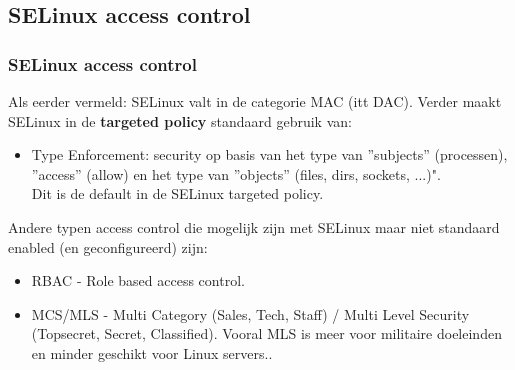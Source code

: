 \subsection{SELinux access control}
\begin{styleframe}
    \frametitle{SELinux access control}
\pause
Als eerder vermeld: SELinux valt in de categorie MAC (itt DAC). Verder maakt SELinux in de {\bf targeted policy} standaard gebruik van:
\begin{itemize}
	\item Type Enforcement: security op basis van het type van ''subjects'' (processen), ''access'' (allow) en het type van ''objects'' (files, dirs, sockets, ...)".\\
Dit is de default in de SELinux targeted policy.
\end{itemize}
\pause
Andere typen access control die mogelijk zijn met SELinux maar niet standaard enabled (en geconfigureerd) zijn:
\begin{itemize}
	\item RBAC - Role based access control.
	\pause
	\item MCS/MLS - Multi Category (Sales, Tech, Staff) / Multi Level Security (Topsecret, Secret, Classified). Vooral MLS is meer voor militaire doeleinden en minder geschikt voor Linux servers..
\end{itemize}
%
\end{styleframe}


